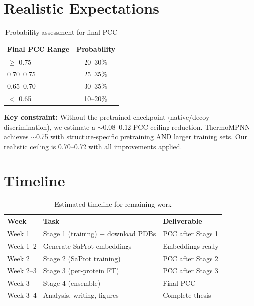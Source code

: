 \section{Realistic Expectations}

\begin{table}[h]
\centering
\caption{Probability assessment for final PCC}
\label{tab:probability}
\begin{tabular}{lc}
\toprule
\textbf{Final PCC Range} & \textbf{Probability} \\
\midrule
$\geq$ 0.75 & 20--30\% \\
0.70--0.75 & 25--35\% \\
0.65--0.70 & 30--35\% \\
$<$ 0.65 & 10--20\% \\
\bottomrule
\end{tabular}
\end{table}

\textbf{Key constraint:} Without the pretrained checkpoint (native/decoy discrimination), we estimate a $\sim$0.08--0.12 PCC ceiling reduction. ThermoMPNN achieves $\sim$0.75 with structure-specific pretraining AND larger training sets. Our realistic ceiling is 0.70--0.72 with all improvements applied.

\section{Timeline}

\begin{table}[h]
\centering
\caption{Estimated timeline for remaining work}
\label{tab:timeline}
\begin{tabular}{lll}
\toprule
\textbf{Week} & \textbf{Task} & \textbf{Deliverable} \\
\midrule
Week 1 & Stage 1 (training) + download PDBs & PCC after Stage 1 \\
Week 1--2 & Generate SaProt embeddings & Embeddings ready \\
Week 2 & Stage 2 (SaProt training) & PCC after Stage 2 \\
Week 2--3 & Stage 3 (per-protein FT) & PCC after Stage 3 \\
Week 3 & Stage 4 (ensemble) & Final PCC \\
Week 3--4 & Analysis, writing, figures & Complete thesis \\
\bottomrule
\end{tabular}
\end{table}

